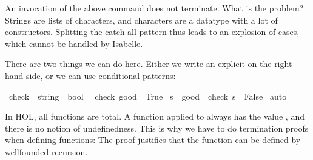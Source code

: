 \begin{isabellebody}
\begin{isamarkuptext}
  \noindent An invocation of the above  command does not
  terminate. What is the problem? Strings are lists of characters, and
  characters are a datatype with a lot of constructors. Splitting the
  catch-all pattern thus leads to an explosion of cases, which cannot
  be handled by Isabelle.

  There are two things we can do here. Either we write an explicit
   on the right hand side, or we can use conditional patterns:%
\end{isamarkuptext}%
\isamarkuptrue%
\isamarkupfalse%
\ check\ {}{}\ {}string\ {}\ bool{}\isanewline
{}\isanewline
\ \ {}check\ {}{}{}good{}{}{}\ {}\ True{}\isanewline
{}\ {}s\ {}\ {}{}good{}{}\ {}\ check\ s\ {}\ False{}\isanewline
%
\isadelimproof
%
\endisadelimproof
%
\isatagproof
{}\isamarkupfalse%
\ auto%
\endisatagproof
{\isafoldproof}%
%
\isadelimproof
%
\endisadelimproof
%
\isamarkuptrue%
%
\begin{isamarkuptext}%
In HOL, all functions are total. A function  applied to
   always has the value , and there is no notion
  of undefinedness. 
  This is why we have to do termination
  proofs when defining functions: The proof justifies that the
  function can be defined by wellfounded recursion.


\end{isamarkuptext}
\end{isabellebody}
